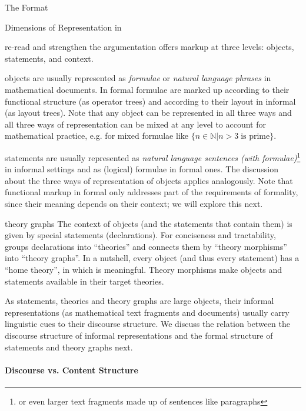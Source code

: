 \begin{omgroup}[creators=miko,id=spec-intro]{The {\omdoc} Format}
\begin{omgroup}[id=syntax-semantics]{Dimensions of Representation in {\omdoc}}
\begin{newpart}{re-read and strengthen the argumentation}
\omdoc offers markup at three levels: objects, statements, and context.
\begin{compactdesc}
\item[objects] are usually represented as {\emph{formulae}} or \emph{natural language
    phrases} in mathematical documents. In formal \omdoc formulae are marked up according
  to their functional structure (as operator trees) and according to their layout in
  informal \omdoc (as layout trees). Note that any object can be represented in all three
  ways and all three ways of representation can be mixed at any level to account for
  mathematical practice, e.g. for mixed formulae like $\{n\in\mathbb{N}\bigl|n>3 \;\text{
    is prime}\}$.
\item[statements] are usually represented as \emph{natural language sentences (with
    formulae)}\footnote{or even larger text fragments made up of sentences like
    paragraphs} in informal settings and as (logical) formulae in formal ones. The
  discussion about the three ways of representation of objects applies analogously. Note
  that functional markup in formal \omdoc only addresses part of the requirements of
  formality, since their meaning depends on their context; we will explore this next.
\item[theory graphs] The context of objects (and the statements that contain
  them) is given by special statements (declarations). For conciseness and tractability,
  \omdoc groups declarations into ``theories'' and connects them by ``theory morphisms''
  into ``theory graphs''. In a nutshell, every object (and thus every statement) has a
  ``home theory'', in which is meaningful. Theory morphisms make objects and statements
  available in their target theories. 
\end{compactdesc}
As statements, theories and theory graphs are large objects, their informal
representations (as mathematical text fragments and documents) usually carry linguistic
cues to their discourse structure. We discuss
the relation between the discourse structure of informal representations and the formal
structure of statements and theory graphs next.

\paragraph{Discourse vs. Content Structure}


\end{newpart}
\end{omgroup}
\end{omgroup}
